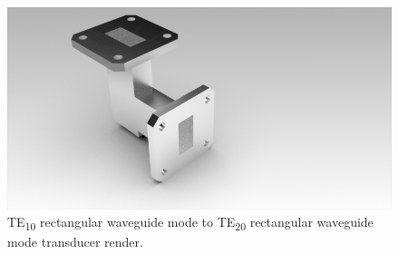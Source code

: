 \documentclass[english,twoside]{article}
\begin{document}
		\begin{figure}[H]
			\centering
			\includegraphics[width=.7\textwidth]{renders/wrToWrTE20_irises}
			\caption{TE\textsubscript{10} rectangular waveguide mode to TE\textsubscript{20} rectangular waveguide mode transducer render.}
		\end{figure}
	
\end{document}
